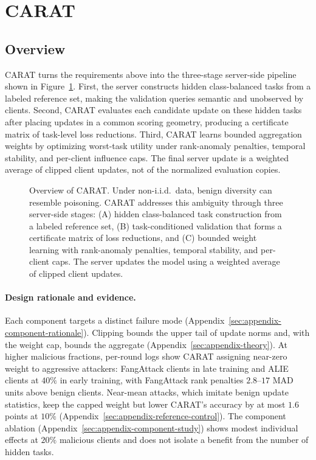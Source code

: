\section{CARAT}
\label{sec:method}

\subsection{Overview}

CARAT turns the requirements above into the three-stage server-side pipeline shown in Figure~\ref{fig:carat-overview}. First, the server constructs hidden class-balanced tasks from a labeled reference set, making the validation queries semantic and unobserved by clients. Second, CARAT evaluates each candidate update on these hidden tasks after placing updates in a common scoring geometry, producing a certificate matrix of task-level loss reductions. Third, CARAT learns bounded aggregation weights by optimizing worst-task utility under rank-anomaly penalties, temporal stability, and per-client influence caps. The final server update is a weighted average of clipped client updates, not of the normalized evaluation copies.

\begin{figure}[!htbp]
\centering
{}
\caption{Overview of CARAT. Under non-i.i.d.\ data, benign diversity can resemble poisoning. CARAT addresses this ambiguity through three server-side stages: (A) hidden class-balanced task construction from a labeled reference set, (B) task-conditioned validation that forms a certificate matrix of loss reductions, and (C) bounded weight learning with rank-anomaly penalties, temporal stability, and per-client caps. The server updates the model using a weighted average of clipped client updates.}
\label{fig:carat-overview}
\end{figure}

\paragraph{Design rationale and evidence.} Each component targets a distinct failure mode (Appendix~\ref{sec:appendix-component-rationale}). Clipping bounds the upper tail of update norms and, with the weight cap, bounds the aggregate (Appendix~\ref{sec:appendix-theory}). At higher malicious fractions, per-round logs show CARAT assigning near-zero weight to aggressive attackers: FangAttack clients in late training and ALIE clients at $40\%$ in early training, with FangAttack rank penalties $2.8$--$17$ MAD units above benign clients. Near-mean attacks, which imitate benign update statistics, keep the capped weight but lower CARAT's accuracy by at most $1.6$ points at $10\%$ (Appendix~\ref{sec:appendix-reference-control}). The component ablation (Appendix~\ref{sec:appendix-component-study}) shows modest individual effects at $20\%$ malicious clients and does not isolate a benefit from the number of hidden tasks.

